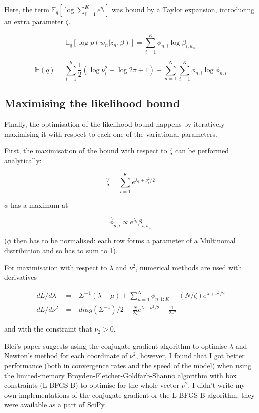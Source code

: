 \documentclass[12pt,a4paper,twoside,openright]{report}
\begin{document}
Here, the term $\mathbb{E}_q[\log \sum\limits_{i=1}^K e^{\eta_i}]$ was bound by a Taylor expansion, introducing an extra parameter $\zeta$.

\begin{equation}
\mathbb{E}_q[\log p(w_n | z_n, \beta)] = \sum\limits_{i=1}^K\phi_{n,i}\log\beta_{i, w_n}
\end{equation}

\begin{equation}
\mathbb{H}(q) = \sum\limits_{i=1}^K\frac{1}{2}(\log\nu_i^2 + \log 2 \pi + 1) - \sum\limits_{n=1}^N\sum\limits_{i=1}^K\phi_{n,i}\log\phi_{n,i}
\end{equation}

\subsection{Maximising the likelihood bound}

Finally, the optimisation of the likelihood bound happens by iteratively maximising it with respect to each one of the variational parameters.

First, the maximisation of the bound with respect to $\zeta$ can be performed analytically:

\begin{equation}
\hat\zeta = \sum\limits_{i=1}^Ke^{\lambda_i + \nu_i^2 / 2}
\end{equation}

$\phi$ has a maximum at

\begin{equation}
\hat\phi_{n, i} \propto e^{\lambda_i}\beta_{i, w_n} \label{eq:phiopt}
\end{equation}

($\phi$ then has to be normalised: each row forms a parameter of a Multinomal distribution and so has to sum to 1).

For maximisation with respect to $\lambda$ and $\nu^2$, numerical methods are used with derivatives

\begin{align}
dL/d\lambda & = -\Sigma^{-1}(\lambda - \mu) + \sum\limits_{n=1}^N\phi_{n, 1:K} - (N/\zeta)e^{\lambda + \nu^2/2} \\
dL/d\nu^2 & = -\mathit{diag}(\Sigma^{-1})/2 - \frac{N}{2\zeta}e^{\lambda + \nu^2/2} + \frac{1}{2\nu^2}
\end{align}

and with the constraint that $\nu_2 > 0$.

Blei's paper suggests using the conjugate gradient algorithm to optimise $\lambda$ and Newton's method for each coordinate of $\nu^2$, however, I found that I got better performance (both in convergence rates and the speed of the model) when using the limited-memory Broyden-Fletcher-Goldfarb-Shanno algorithm with box constraints (L-BFGS-B)\cite{doi:10.1137/0916069} to optimise for the whole vector $\nu^2$. I didn't write my own implementations of the conjugate gradient or the L-BFGS-B algorithm: they were available as a part of SciPy.
\end{document}
